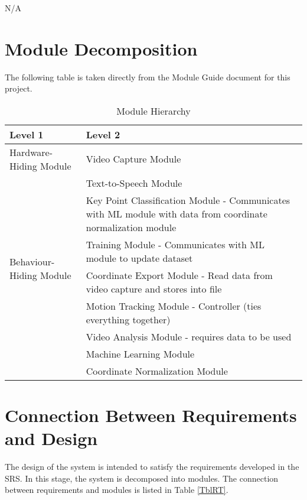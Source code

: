 \documentclass[12pt, titlepage]{article}
\begin{document}
N/A\\

\section{Module Decomposition}

The following table is taken directly from the Module Guide document for this project.

\begin{table}[h!]
\centering
\begin{tabular}{p{} p{}}
\toprule
\textbf{Level 1} & \textbf{Level 2}\\
\midrule

{Hardware-Hiding Module} & Video Capture Module \\
\midrule

\multirow{7}{0.3\textwidth}{Behaviour-Hiding Module} & Text-to-Speech Module\\
& Key Point Classification Module - Communicates with ML module with data from coordinate normalization module\\
& Training Module - Communicates with ML module to update dataset\\
& Coordinate Export Module - Read data from video capture and stores into file\\
& Motion Tracking Module - Controller (ties everything together)\\

\midrule

\multirow{3}{0.3\textwidth}{Software Decision Module} & Video Analysis Module - requires data to be used\\
& Machine Learning Module\\
& Coordinate Normalization Module\\
\bottomrule


\end{tabular}
\caption{Module Hierarchy}
\label{TblMH}
\end{table}

\section{Connection Between Requirements and Design} \label{SecConnection}

The design of the system is intended to satisfy the requirements developed in
the SRS. In this stage, the system is decomposed into modules. The connection
between requirements and modules is listed in Table \ref{TblRT}.
\end{document}
